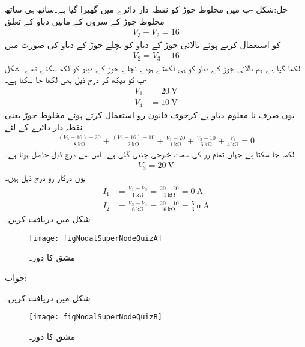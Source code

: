 حل:شکل -ب میں مخلوط جوڑ کو نقطہ دار دائرے میں گھیرا گیا ہے۔ساتھ ہی ساتھ مخلوط جوڑ کے سروں کے مابین دباو کے تعلق
\begin{align*}
V_3-V_2=16
\end{align*}
 کو استعمال کرتے ہوئے بالائی جوڑ کے دباو کو نچلے جوڑ کے دباو کی صورت میں
\begin{align*}
V_2=V_3-16
\end{align*}
 لکھا گیا ہے۔ہم بالائی جوڑ کے دباو کو  ہی لکھتے ہوئے نچلے جوڑ کے دباو کو  لکھ سکتے تھے۔ شکل -ب  کو دیکھ کر درج ذیل بھی لکھا جا سکتا ہے۔
\begin{align*}
V_1&=\SI{20}{\volt}\\
V_4&=\SI{10}{\volt}
\end{align*}
یوں صرف  نا معلوم دباو ہے۔کرخوف قانون رو استعمال کرتے ہوئے مخلوط جوڑ یعنی نقطہ دار دائرے کے لئے 
\begin{align*}
\frac{(V_3-16)-20}{\SI{8}{\kilo\ohm}}+\frac{(V_3-16)-10}{\SI{2}{\kilo\ohm}}+\frac{V_3-20}{\SI{1}{\kilo\ohm}}+\frac{V_3-10}{\SI{6}{\kilo\ohm}}+\frac{V_3}{\SI{4}{\kilo\ohm}}=0
\end{align*}
لکھا جا سکتا ہے جہاں تمام رو کی سمت خارجی چننی گئی ہے۔ اس سے درج ذیل حاصل ہوتا ہے۔
\begin{align*}
V_3=\SI{20}{\volt}
\end{align*}
یوں درکار رو درج ذیل ہیں۔
\begin{align*}
I_1&=\frac{V_1-V_3}{\SI{1}{\kilo\ohm}}=\frac{20-20}{\SI{1}{\kilo\ohm}}=\SI{0}{\ampere}\\
I_2&=\frac{V_3-V_4}{\SI{6}{\kilo\ohm}}=\frac{20-10}{\SI{6}{\kilo\ohm}}=\frac{5}{3}\,\si{\milli\ampere}
\end{align*}
شکل  میں  دریافت کریں۔
\begin{figure}
\centering
\texttt{[image: figNodalSuperNodeQuizA]}
\caption{مشق  کا دور۔}
\label{شکل_جوڑ_مشق_مخلوط_الف}
\end{figure}

جواب:

شکل  میں  دریافت کریں۔
\begin{figure}
\centering
\texttt{[image: figNodalSuperNodeQuizB]}
\caption{مشق  کا دور۔}
\label{شکل_جوڑ_مشق_مخلوط_ب}
\end{figure}


